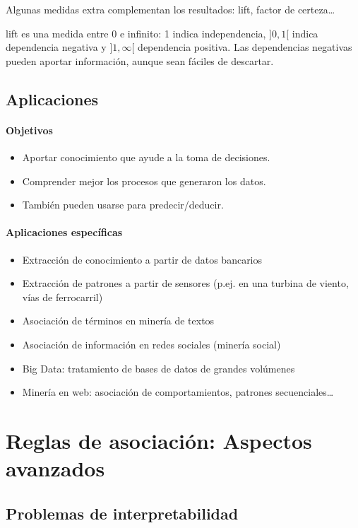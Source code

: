 \documentclass[a4paper,11pt,spanish]{report}
\let\stdchapter\chapter
\let\stdsection\section
\let\stdsub\subsection
\let\stdsubsub\subsubsection
\renewcommand{\part}{\stdchapter}
\renewcommand{\chapter}{\stdsection}
\renewcommand{\section}{\stdsub}
\renewcommand{\subsection}{\stdsubsub}
\begin{document}
Algunas medidas extra complementan los resultados: lift, factor de certeza\ldots{}

lift es una medida entre 0 e infinito: 1 indica independencia, $]0,1[$ indica dependencia negativa y $]1,\infty[$ dependencia positiva. Las dependencias negativas pueden aportar información, aunque sean fáciles de descartar.

\chapter{Aplicaciones}
\label{sec-3-7}

\subsection*{Objetivos}
\label{sec-3-7-0-1}
\begin{itemize}
\item Aportar conocimiento que ayude a la toma de decisiones.
\item Comprender mejor los procesos que generaron los datos.
\item También pueden usarse para predecir/deducir.
\end{itemize}

\subsection*{Aplicaciones específicas}
\label{sec-3-7-0-2}
\begin{itemize}
\item Extracción de conocimiento a partir de datos bancarios
\item Extracción de patrones a partir de sensores (p.ej. en una turbina de viento, vías de ferrocarril)
\item Asociación de términos en minería de textos
\item Asociación de información en redes sociales (minería social)
\item Big Data: tratamiento de bases de datos de grandes volúmenes
\item Minería en web: asociación de comportamientos, patrones secuenciales\ldots{}
\end{itemize}

\part{Reglas de asociación: Aspectos avanzados}
\label{sec-4}

\chapter{Problemas de interpretabilidad}
\label{sec-4-1}
\end{document}
